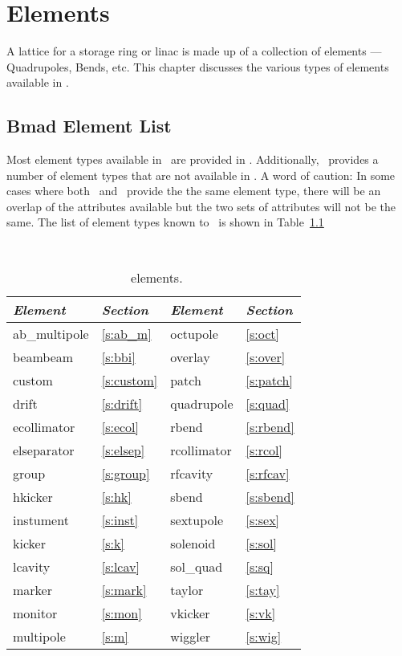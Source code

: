 \chapter{Elements}

A lattice for a storage ring or linac is made up of a collection of
elements --- Quadrupoles, Bends, etc. This chapter discusses the
various types of elements available in \bmad.


\section{Bmad Element List}


Most element types available in \mad\ are provided in \bmad.
Additionally, \bmad\ provides a number of element types that are not
available in \mad.  A word of caution: In some cases where both \mad\
and \bmad\ provide the the same element type, there will be an overlap of 
the attributes available but the two sets of attributes will not be the same.
The list of element types known to \bmad\ is shown in Table~\ref{tab:elements}
\begin{table}[h]
\centering
{\tt
\begin{tabular}{|l|l||l|l|} \hline
  {\it Element} & {\it Section}  & {\it Element} & {\it Section} \\ \hline
  ab\_multipole & \ref{s:ab_m}   &  octupole     & \ref{s:oct}   \\ \hline
  beambeam      & \ref{s:bbi}    &  overlay      & \ref{s:over}  \\ \hline
  custom        & \ref{s:custom} &  patch        & \ref{s:patch} \\ \hline
  drift         & \ref{s:drift}  &  quadrupole   & \ref{s:quad}  \\ \hline
  ecollimator   & \ref{s:ecol}   &  rbend        & \ref{s:rbend} \\ \hline
  elseparator   & \ref{s:elsep}  &  rcollimator  & \ref{s:rcol}  \\ \hline
  group         & \ref{s:group}  &  rfcavity     & \ref{s:rfcav} \\ \hline
  hkicker       & \ref{s:hk}     &  sbend        & \ref{s:sbend} \\ \hline
  instument     & \ref{s:inst}   &  sextupole    & \ref{s:sex}   \\ \hline
  kicker        & \ref{s:k}      &  solenoid     & \ref{s:sol}   \\ \hline
  lcavity       & \ref{s:lcav}   &  sol\_quad    & \ref{s:sq}    \\ \hline
  marker        & \ref{s:mark}   &  taylor       & \ref{s:tay}   \\ \hline
  monitor       & \ref{s:mon}    &  vkicker      & \ref{s:vk}    \\ \hline
  multipole     & \ref{s:m}      &  wiggler      & \ref{s:wig}   \\ \hline
\end{tabular}}
\caption{\bmad\ elements.}
\label{tab:elements}\center
\end{table}

